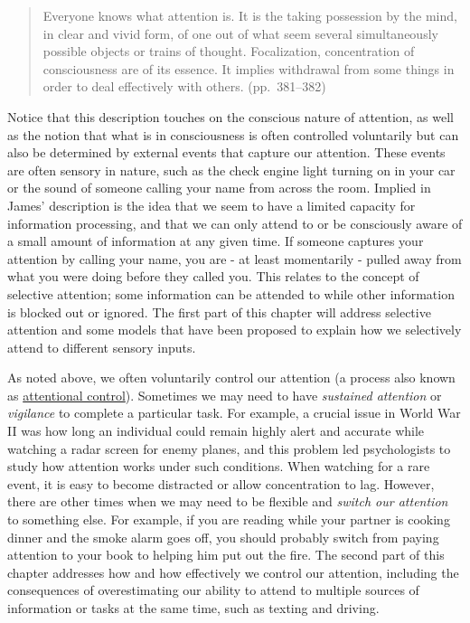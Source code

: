 \documentclass[
]{krantz}
\begin{document}
\begin{quote}
Everyone knows what attention is. It is the taking possession by the mind, in clear and vivid form, of one out of what seem several simultaneously possible objects or trains of thought. Focalization, concentration of consciousness are of its essence. It implies withdrawal from some things in order to deal effectively with others. (pp.~381--382)
\end{quote}

Notice that this description touches on the conscious nature of attention, as well as the notion that what is in consciousness is often controlled voluntarily but can also be determined by external events that capture our attention. These events are often sensory in nature, such as the check engine light turning on in your car or the sound of someone calling your name from across the room. Implied in James' description is the idea that we seem to have a limited capacity for information processing, and that we can only attend to or be consciously aware of a small amount of information at any given time. If someone captures your attention by calling your name, you are - at least momentarily - pulled away from what you were doing before they called you. This relates to the concept of selective attention; some information can be attended to while other information is blocked out or ignored. The first part of this chapter will address selective attention and some models that have been proposed to explain how we selectively attend to different sensory inputs.

As noted above, we often voluntarily control our attention (a process also known as \hyperref[attentional-control]{attentional control}). Sometimes we may need to have \emph{sustained attention} or \emph{vigilance} to complete a particular task. For example, a crucial issue in World War II was how long an individual could remain highly alert and accurate while watching a radar screen for enemy planes, and this problem led psychologists to study how attention works under such conditions. When watching for a rare event, it is easy to become distracted or allow concentration to lag. However, there are other times when we may need to be flexible and \emph{switch our attention} to something else. For example, if you are reading while your partner is cooking dinner and the smoke alarm goes off, you should probably switch from paying attention to your book to helping him put out the fire. The second part of this chapter addresses how and how effectively we control our attention, including the consequences of overestimating our ability to attend to multiple sources of information or tasks at the same time, such as texting and driving.
\end{document}
